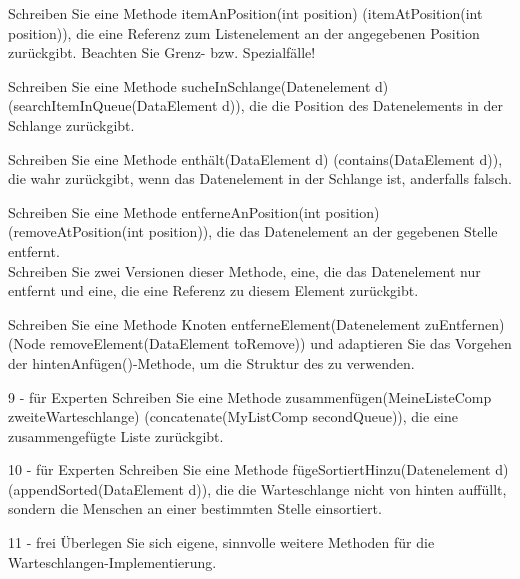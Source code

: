 \documentclass{article}
\begin{document}
\begin{task}{4}
    Schreiben Sie eine Methode itemAnPosition(int position) (itemAtPosition(int position)), die eine Referenz zum Listenelement an der angegebenen Position zurückgibt. Beachten Sie Grenz- bzw. Spezialfälle!
\end{task}
    
\begin{task}{5}
    Schreiben Sie eine Methode sucheInSchlange(Datenelement d) (searchItemInQueue(DataElement d)), die die Position des Datenelements in der Schlange zurückgibt. \\
\end{task}
    
\begin{task}{6}
    Schreiben Sie eine Methode enthält(DataElement d) (contains(DataElement d)), die wahr zurückgibt, wenn das Datenelement in der Schlange ist, anderfalls falsch.
\end{task}
\begin{task}{7}
    Schreiben Sie eine Methode entferneAnPosition(int position) (removeAtPosition(int position)), die das Datenelement an der gegebenen Stelle entfernt.\\
    Schreiben Sie zwei Versionen dieser Methode, eine, die das Datenelement nur entfernt und eine, die eine Referenz zu diesem Element zurückgibt.
\end{task}

\begin{task}{8}
Schreiben Sie eine Methode Knoten entferneElement(Datenelement zuEntfernen) (Node removeElement(DataElement toRemove)) und adaptieren Sie das Vorgehen der hintenAnfügen()-Methode, um die Struktur des  zu verwenden.
\end{task}

\begin{task}{9 - für Experten}
    Schreiben Sie eine Methode zusammenfügen(MeineListeComp zweiteWarteschlange) (concatenate(MyListComp secondQueue)), die eine zusammengefügte Liste zurückgibt. 
\end{task}
    
\begin{task}{10 - für Experten}
    Schreiben Sie eine Methode fügeSortiertHinzu(Datenelement d) (appendSorted(DataElement d)), die die Warteschlange nicht von hinten auffüllt, sondern die Menschen an einer bestimmten Stelle einsortiert. \\
    \end{task}
    
\begin{task}{11 - frei}
    Überlegen Sie sich eigene, sinnvolle weitere Methoden für die Warteschlangen-Implementierung.
\end{task}
\end{document}
